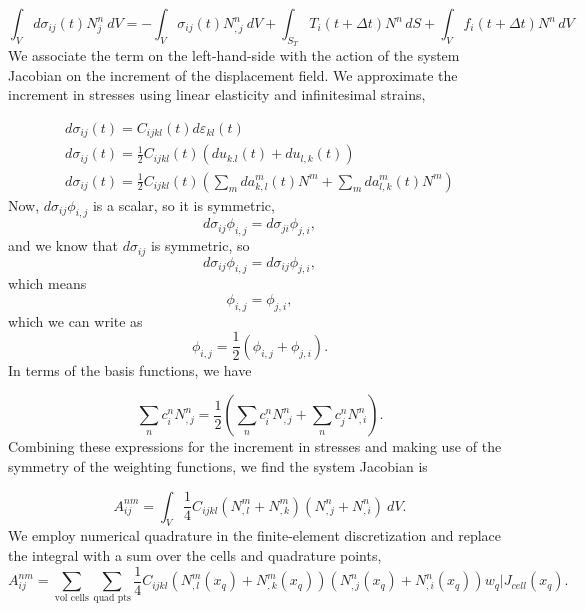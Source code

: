 \begin{equation}
\int_{V}d\sigma_{ij}(t)N_{j}^{n}\ dV=-\int_{V}\sigma_{ij}(t)N_{,j}^{n}\: dV+\int_{S_{T}}T_{i}(t+\Delta t)N^{n}\, dS+\int_{V}f_{i}(t+\Delta t)N^{n}\, dV
\end{equation}
We associate the term on the left-hand-side with the action of the
system Jacobian on the increment of the displacement field. We approximate
the increment in stresses using linear elasticity and infinitesimal
strains,

\begin{gather}
d\sigma_{ij}(t)=C_{ijkl}(t)d\varepsilon_{kl}(t)\\
d\sigma_{ij}(t)=\frac{1}{2}C_{ijkl}(t)(du_{k.l}(t)+du_{l,k}(t))\\
d\sigma_{ij}(t)=\frac{1}{2}C_{ijkl}(t)(\sum_{m}da_{k,l}^{m}(t)N^{m}+\sum_{m}da_{l,k}^{m}(t)N^{m})
\end{gather}
Now, $d\sigma_{ij}\phi_{i,j}$ is a scalar, so it is symmetric,
\begin{equation}
d\sigma_{ij}\phi_{i,j}=d\sigma_{ji}\phi_{j,i},
\end{equation}
and we know that $d\sigma_{ij}$ is symmetric, so
\begin{equation}
d\sigma_{ij}\phi_{i,j}=d\sigma_{ij}\phi_{j,i},
\end{equation}
which means
\begin{equation}
\phi_{i,j}=\phi_{j,i},
\end{equation}
which we can write as
\begin{equation}
\phi_{i,j}=\frac{1}{2}(\phi_{i,j}+\phi_{j,i}).
\end{equation}
In terms of the basis functions, we have

\begin{equation}
\sum_{n}c_{i}^{n}N_{,j}^{n}=\frac{1}{2}(\sum_{n}c_{i}^{n}N_{,j}^{n}+\sum_{n}c_{j}^{n}N_{,i}^{n}).
\end{equation}
Combining these expressions for the increment in stresses and making
use of the symmetry of the weighting functions, we find the system
Jacobian is

\begin{equation}
A_{ij}^{nm}=\int_{V}\frac{1}{4}C_{ijkl}(N_{,l}^{m}+N_{,k}^{m})(N_{,j}^{n}+N_{,i}^{n})\ dV.
\end{equation}
We employ numerical quadrature in the finite-element discretization
and replace the integral with a sum over the cells and quadrature
points,
\begin{equation}
A_{ij}^{nm}=\sum_{\text{vol cells}}\sum_{\text{quad pts}}\frac{1}{4}C_{ijkl}(N_{,l}^{m}(x_{q})+N_{,k}^{m}(x_{q}))(N_{,j}^{n}(x_{q})+N_{,i}^{n}(x_{q}))w_{q}|J_{cell}(x_{q}).
\end{equation}

